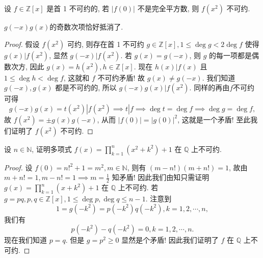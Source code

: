 \documentclass[../../main.tex]{subfiles}
\begin{document}
\begin{example}\label{example:不可约多项式证明例题11}
设 \( f \in \mathbb{Z}[x] \) 是首 1 不可约的, 若 \( |f(0)| \) 不是完全平方数, 则 \( f(x^2) \) 不可约.
\end{example}
\begin{remark}
$g(-x)g(x)$的奇数次项恰好抵消了.
\end{remark}
\begin{proof}
假设 \( f(x^2) \) 可约, 则存在首 1 不可约 \( g \in \mathbb{Z}[x], 1 \leq \deg g < 2\deg f \) 使得 \( g(x)|f(x^2) \), 显然 \( g(-x)|f(x^2) \). 若 \( g(x) = g(-x) \), 则 \( g \) 的每一项都是偶数次方, 因此 \( g(x) = h(x^2), h \in \mathbb{Z}[x] \). 现在 \( h(x)|f(x) \) 且 \( 1 \leq \deg h < \deg f \), 这就和 \( f \) 不可约矛盾! 故 \( g(x) \neq g(-x) \). 我们知道 \( g(-x), g(x) \) 都是不可约的, 所以 \( g(-x)g(x)|f(x^2) \). 同样的再由$f$不可约可得
\[
g(-x)g(x) = t(x^2)|f(x^2) \implies t|f \implies \deg t = \deg f \implies \deg g = \deg f,
\]
故 \( f(x^2) = \pm g(x)g(-x) \), 从而 \( |f(0)| = |g(0)|^2 \), 这就是一个矛盾! 至此我们证明了 \( f(x^2) \) 不可约.
\end{proof}

\begin{example}
设 \( n \in \mathbb{N} \), 证明多项式 \( f(x) = \prod_{k=1}^n (x^2 + k^2) + 1 \) 在 \( \mathbb{Q} \) 上不可约.
\end{example}
\begin{proof}
设 \( f(0) = n!^2 + 1 = m^2, m \in \mathbb{N} \), 则有 \( (m - n!)(m + n!) = 1 \), 故由 \( m + n! = 1, m - n! = 1 \implies m = \frac{1}{2} \) 知矛盾! 因此我们由知只需证明 \( g(x) = \prod_{k=1}^n (x + k^2) + 1 \) 在 \( \mathbb{Q} \) 上不可约. 若 \( g = pq, p,q \in \mathbb{Z}[x], 1 \leq \deg p, \deg q \leq n - 1 \). 注意到
\[
1 = g(-k^2) = p(-k^2)q(-k^2), k = 1,2,\cdots,n,
\]
我们有
\[
p(-k^2) - q(-k^2) = 0, k = 1,2,\cdots,n.
\]
现在我们知道 \( p = q \). 但是 \( g = p^2 \geq 0 \) 显然是个矛盾! 因此我们证明了 \( f \) 在 \( \mathbb{Q} \) 上不可约.
\end{proof}
\end{document}
